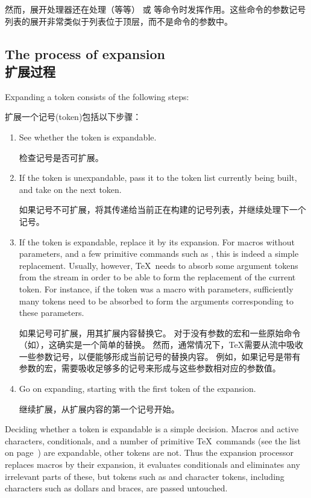 然而，展开处理器还在处理（等等） 或  等命令时发挥作用。这些命令的参数记号列表的展开非常类似于列表位于顶层，而不是命令的参数中。




\subsection{The process of expansion\\扩展过程}

Expanding a token consists of the following steps:

扩展一个记号(token)包括以下步骤：
\begin{enumerate}
\item See whether the token is expandable. 

检查记号是否可扩展。
\item If the token is unexpandable, pass it to the token
      list currently being built, and take on the next token. 

      如果记号不可扩展，将其传递给当前正在构建的记号列表，并继续处理下一个记号。
\item If the token is expandable, replace it by its expansion.
      For macros without parameters, and a few primitive commands
      such as , this is indeed a simple replacement.
      Usually, however, \TeX\ needs to absorb some argument tokens from
      the stream in order to be able to form the replacement
      of the current token.
      For instance, if the token was a macro with parameters,
      sufficiently many tokens need to be absorbed to form
      the arguments corresponding to  these parameters.

      如果记号可扩展，用其扩展内容替换它。
对于没有参数的宏和一些原始命令（如），这确实是一个简单的替换。
然而，通常情况下，\TeX 需要从流中吸收一些参数记号，以便能够形成当前记号的替换内容。
例如，如果记号是带有参数的宏，需要吸收足够多的记号来形成与这些参数相对应的参数值。
\item Go on expanding, starting with the first token of the
      expansion. 

      继续扩展，从扩展内容的第一个记号开始。
\end{enumerate}
%
Deciding whether a token is expandable is
a simple decision. Macros and active characters, 
conditionals, and a number of primitive \TeX\ commands
\awp
(see the list on page~\pageref{expand:lijst})
are expandable, other tokens are not.
Thus the expansion processor replaces macros by their expansion,
it evaluates conditionals and eliminates any irrelevant parts of 
these, but tokens such as  and character tokens,
including characters such as dollars and braces, are passed untouched.

